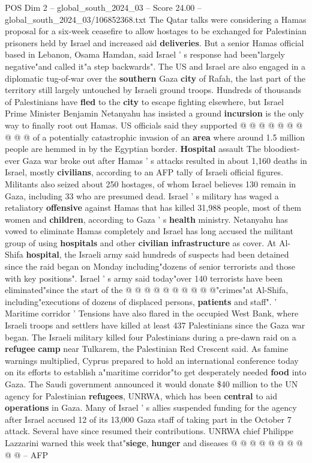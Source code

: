 \begin{textsample}{POS Dim 2 – global\_south\_2024\_03 – Score 24.00 – global\_south\_2024\_03/106852368.txt}
The Qatar talks were considering a Hamas proposal for a six-week ceasefire to allow hostages to be exchanged for Palestinian prisoners held by Israel and increased aid \textbf{deliveries}.
But a senior Hamas official based in Lebanon, Osama Hamdan, said Israel ' s response had been"largely negative"and called it"a step backwards".
The US and Israel are also engaged in a diplomatic tug-of-war over the \textbf{southern} Gaza \textbf{city} of Rafah, the last part of the territory still largely untouched by Israeli ground troops.
Hundreds of thousands of Palestinians have \textbf{fled} to the \textbf{city} to escape fighting elsewhere, but Israel Prime Minister Benjamin Netanyahu has insisted a ground \textbf{incursion} is the only way to finally root out Hamas.
US officials said they supported @ @ @ @ @ @ @ @ @ @ of a potentially catastrophic invasion of an \textbf{area} where around 1.5 million people are hemmed in by the Egyptian border. \textbf{Hospital} assault The bloodiest-ever Gaza war broke out after Hamas ' s attacks resulted in about 1,160 deaths in Israel, mostly \textbf{civilians}, according to an AFP tally of Israeli official figures.
Militants also seized about 250 hostages, of whom Israel believes 130 remain in Gaza, including 33 who are presumed dead.
Israel ' s military has waged a retaliatory \textbf{offensive} against Hamas that has killed 31,988 people, most of them women and \textbf{children}, according to Gaza ' s \textbf{health} ministry.
Netanyahu has vowed to eliminate Hamas completely and Israel has long accused the militant group of using \textbf{hospitals} and other \textbf{civilian} \textbf{infrastructure} as cover.
At Al-Shifa \textbf{hospital}, the Israeli army said hundreds of suspects had been detained since the raid began on Monday including"dozens of senior terrorists and those with key positions".
Israel ' s army said today"over 140 terrorists have been eliminated"since the start of the @ @ @ @ @ @ @ @ @ @"crimes"at Al-Shifa, including"executions of dozens of displaced persons, \textbf{patients} and staff". ' Maritime corridor ' Tensions have also flared in the occupied West Bank, where Israeli troops and settlers have killed at least 437 Palestinians since the Gaza war began.
The Israeli military killed four Palestinians during a pre-dawn raid on a \textbf{refugee} \textbf{camp} near Tulkarem, the Palestinian Red Crescent said.
As famine warnings multiplied, Cyprus prepared to hold an international conference today on its efforts to establish a"maritime corridor"to get desperately needed \textbf{food} into Gaza.
The Saudi government announced it would donate \$40 million to the UN agency for Palestinian \textbf{refugees}, UNRWA, which has been \textbf{central} to aid \textbf{operations} in Gaza.
Many of Israel ' s allies suspended funding for the agency after Israel accused 12 of its 13,000 Gaza staff of taking part in the October 7 attack.
Several have since resumed their contributions.
UNRWA chief Philippe Lazzarini warned this week that"\textbf{siege}, \textbf{hunger} and diseases @ @ @ @ @ @ @ @ @ @ -- AFP


\end{textsample}
